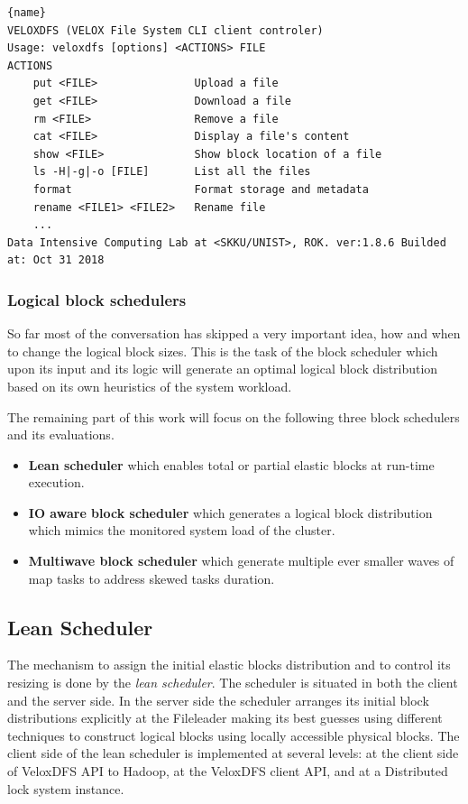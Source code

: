 \begin{lstlisting}[caption=extracted from veloxdfs --help, label={lst:cli}, frame=tb]{name}
VELOXDFS (VELOX File System CLI client controler)
Usage: veloxdfs [options] <ACTIONS> FILE
ACTIONS
    put <FILE>               Upload a file
    get <FILE>               Download a file
    rm <FILE>                Remove a file
    cat <FILE>               Display a file's content
    show <FILE>              Show block location of a file
    ls -H|-g|-o [FILE]       List all the files
    format                   Format storage and metadata
    rename <FILE1> <FILE2>   Rename file 
    ...
Data Intensive Computing Lab at <SKKU/UNIST>, ROK. ver:1.8.6 Builded at: Oct 31 2018
\end{lstlisting}

\subsubsection{Logical block schedulers}
So far most of the conversation has skipped a very important idea, how and when to change the logical block sizes. This is the task of the block scheduler which upon its input and its logic will generate an optimal logical block distribution based on its own heuristics of the system workload.

The remaining part of this work will focus on the following three block schedulers and its evaluations. 
\begin{itemize}
    \item \textbf{Lean scheduler} which enables total or partial elastic blocks at run-time execution.
    \item \textbf{IO aware block scheduler} which generates a logical block distribution which mimics the monitored system load of the cluster.
    \item \textbf{Multiwave block scheduler} which generate multiple ever smaller waves of map tasks to address skewed tasks duration.
\end{itemize}

\subsection{Lean Scheduler}
The mechanism to assign the initial elastic blocks distribution and to control its resizing is done by the \textit{lean scheduler}. The scheduler is situated in both the client and the server side. In the server side the scheduler arranges its initial block distributions explicitly at the Fileleader making its best guesses using different techniques to construct logical blocks using locally accessible physical blocks. The client side of the lean scheduler is implemented at several levels: at the client side of VeloxDFS API to Hadoop, at the VeloxDFS client API, and at a Distributed lock system instance. 

